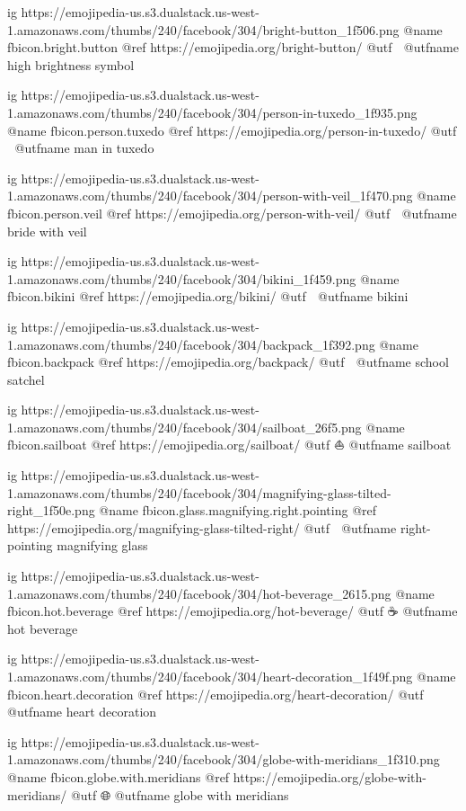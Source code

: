   ig https://emojipedia-us.s3.dualstack.us-west-1.amazonaws.com/thumbs/240/facebook/304/bright-button_1f506.png
  @name fbicon.bright.button
  @ref https://emojipedia.org/bright-button/
  @utf 🔆
  @utfname high brightness symbol

  ig https://emojipedia-us.s3.dualstack.us-west-1.amazonaws.com/thumbs/240/facebook/304/person-in-tuxedo_1f935.png
  @name fbicon.person.tuxedo
  @ref https://emojipedia.org/person-in-tuxedo/
  @utf 🤵
  @utfname man in tuxedo

  ig https://emojipedia-us.s3.dualstack.us-west-1.amazonaws.com/thumbs/240/facebook/304/person-with-veil_1f470.png
  @name fbicon.person.veil
  @ref https://emojipedia.org/person-with-veil/
  @utf 👰
  @utfname bride with veil

  ig https://emojipedia-us.s3.dualstack.us-west-1.amazonaws.com/thumbs/240/facebook/304/bikini_1f459.png
  @name fbicon.bikini
  @ref https://emojipedia.org/bikini/
  @utf 👙
  @utfname bikini

  ig https://emojipedia-us.s3.dualstack.us-west-1.amazonaws.com/thumbs/240/facebook/304/backpack_1f392.png
  @name fbicon.backpack
  @ref https://emojipedia.org/backpack/
  @utf 🎒
  @utfname school satchel

  ig https://emojipedia-us.s3.dualstack.us-west-1.amazonaws.com/thumbs/240/facebook/304/sailboat_26f5.png
  @name fbicon.sailboat
  @ref https://emojipedia.org/sailboat/
  @utf ⛵
  @utfname sailboat

  ig https://emojipedia-us.s3.dualstack.us-west-1.amazonaws.com/thumbs/240/facebook/304/magnifying-glass-tilted-right_1f50e.png
  @name fbicon.glass.magnifying.right.pointing
  @ref https://emojipedia.org/magnifying-glass-tilted-right/
  @utf 🔎
  @utfname right-pointing magnifying glass

  ig https://emojipedia-us.s3.dualstack.us-west-1.amazonaws.com/thumbs/240/facebook/304/hot-beverage_2615.png
  @name fbicon.hot.beverage
  @ref https://emojipedia.org/hot-beverage/
  @utf ☕
  @utfname hot beverage

  ig https://emojipedia-us.s3.dualstack.us-west-1.amazonaws.com/thumbs/240/facebook/304/heart-decoration_1f49f.png
  @name fbicon.heart.decoration
  @ref https://emojipedia.org/heart-decoration/
  @utf 💟
  @utfname heart decoration

  ig https://emojipedia-us.s3.dualstack.us-west-1.amazonaws.com/thumbs/240/facebook/304/globe-with-meridians_1f310.png
  @name fbicon.globe.with.meridians
  @ref https://emojipedia.org/globe-with-meridians/
  @utf 🌐
  @utfname globe with meridians

